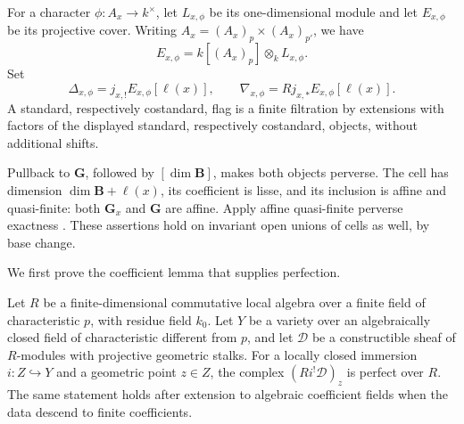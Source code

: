 For a character \(\phi:A_x\to k^\times\), let \(L_{x,\phi}\) be its
one-dimensional module and let \(E_{x,\phi}\) be its projective cover.
Writing \(A_x=(A_x)_p\times(A_x)_{p'}\), we have
\[
 E_{x,\phi}=k[(A_x)_p]\otimes_k L_{x,\phi}.
\]
Set
\[
 \Delta_{x,\phi}=j_{x,!}E_{x,\phi}[\ell(x)],
 \qquad
 \nabla_{x,\phi}=Rj_{x,*}E_{x,\phi}[\ell(x)].
\]
A standard, respectively costandard, flag is a finite filtration by
extensions with factors of the displayed standard, respectively
costandard, objects, without additional shifts.

Pullback to \(\mathbf G\), followed by \([\dim\mathbf B]\), makes both
objects perverse. The cell has dimension
\(\dim\mathbf B+\ell(x)\), its coefficient is lisse, and its inclusion
is affine and quasi-finite: both \(\mathbf G_x\) and \(\mathbf G\) are
affine. Apply affine quasi-finite perverse exactness
\cite[Corollary 4.1.3]{BBD}. These assertions hold on invariant open
unions of cells as well, by base change.

We first prove the coefficient lemma that supplies perfection.

\begin{lemma}\label{geom:flat-costalk}
Let \(R\) be a finite-dimensional commutative local algebra over a
finite field of characteristic \(p\), with residue field \(k_0\).
Let \(Y\) be a variety over an algebraically closed field of
characteristic different from \(p\), and let \(\mathcal D\) be a
constructible sheaf of \(R\)-modules with projective geometric stalks.
For a locally closed immersion \(i:Z\hookrightarrow Y\) and a geometric
point \(z\in Z\), the complex \((Ri^!\mathcal D)_z\) is perfect over
\(R\). The same statement holds after extension to algebraic coefficient
fields when the data descend to finite coefficients.
\end{lemma}

